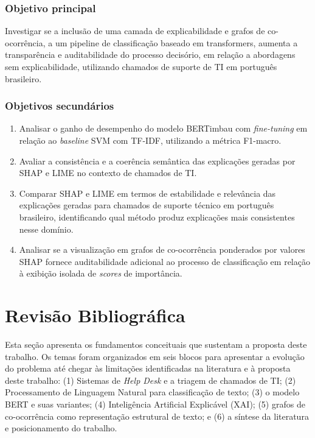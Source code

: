 \documentclass[
    12pt,                %
    openright,           %
    oneside,             %
    a4paper,             %
    english,             %
    brazil               %
]{abntex2}
\begin{document}
\subsection{Objetivo principal}

Investigar se a inclusão de uma camada de explicabilidade e grafos de co-ocorrência, a um pipeline de classificação baseado em transformers, aumenta a transparência e auditabilidade do processo decisório, em relação a abordagens sem explicabilidade, utilizando chamados de suporte de TI em português brasileiro.

\subsection{Objetivos secundários}

\begin{enumerate}

    \item Analisar o ganho de desempenho do modelo BERTimbau com \textit{fine-tuning} em relação ao \textit{baseline} SVM com TF-IDF, utilizando a métrica F1-macro.

    \item Avaliar a consistência e a coerência semântica das explicações geradas por SHAP e LIME no contexto de chamados de TI.

    \item Comparar SHAP e LIME em termos de estabilidade e 
    relevância das explicações geradas para chamados de suporte 
    técnico em português brasileiro, identificando qual método 
    produz explicações mais consistentes nesse domínio.

    \item Analisar se a visualização em grafos de co-ocorrência 
    ponderados por valores SHAP fornece auditabilidade adicional 
    ao processo de classificação em relação à exibição isolada 
    de \textit{scores} de importância.
\end{enumerate}


\chapter{Revisão Bibliográfica}
\label{cap:revisao}

Esta seção apresenta os fundamentos conceituais que sustentam a 
proposta deste trabalho. Os temas foram organizados em seis blocos 
para apresentar a evolução do problema até chegar às limitações 
identificadas na literatura e à proposta deste trabalho: 
(1) Sistemas de \textit{Help Desk} e a triagem de chamados de TI; 
(2) Processamento de Linguagem Natural para classificação de texto; 
(3) o modelo BERT e suas variantes; (4) Inteligência Artificial 
Explicável (XAI); (5) grafos de co-ocorrência como representação 
estrutural de texto; e (6) a síntese da literatura e posicionamento 
do trabalho.
\end{document}

